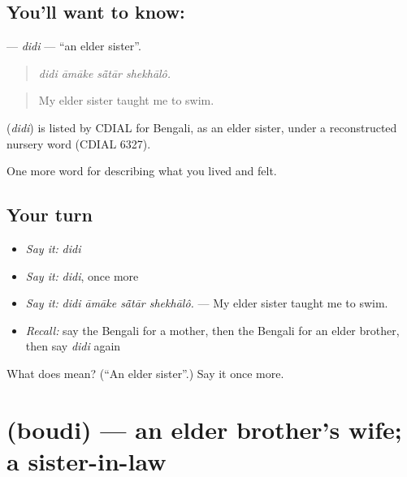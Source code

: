 \subsection*{You'll want to know: }
\textbf{} — \emph{didi} — \textquotedblleft{}an elder sister\textquotedblright{}.

\begin{quote}
   
\end{quote}

\begin{quote}
\emph{didi āmāke sā̃tār shekhālô.}
\end{quote}

\begin{quote}
My elder sister taught me to swim.
\end{quote}

\begin{cousinweb}
\textbf{} (\emph{didi}) is listed by CDIAL for Bengali, as an elder sister, under a reconstructed nursery word (CDIAL 6327).
\end{cousinweb}

\begin{grammarlens}[title={What you've built}]
One more word for describing what you lived and felt.
\end{grammarlens}

\subsection*{Your turn}
\begin{itemize}
\raggedright
  \item \emph{Say it:} \emph{didi}
  \item \emph{Say it:} \emph{didi}, once more
  \item \emph{Say it:} \emph{didi āmāke sā̃tār shekhālô.} — My elder sister taught me to swim.
  \item \emph{Recall:} say the Bengali for a mother, then the Bengali for an elder brother, then say \emph{didi} again
\end{itemize}

\begin{tcolorbox}[breakable,colback=teal!4,colframe=teal!35!black,title={Before you move on}]
What does  mean? (\textquotedblleft{}An elder sister\textquotedblright{}.) Say it once more.
\end{tcolorbox}
\section[\texorpdfstring{\bn{বউদি} (boudi)}{বউদি (boudi)}]{ (boudi) — an elder brother's wife; a sister-in-law}

